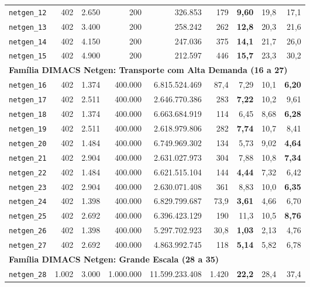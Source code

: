 \documentclass[12pt,a4paper]{article}
\begin{document}
\begin{longtable}{lrrrrrrrr}
\texttt{netgen\_12} & 402 & 2.650 & 200 & 326.853 & 179 & \textbf{9,60} & 19,8 & 17,1 \\
\texttt{netgen\_13} & 402 & 3.400 & 200 & 258.242 & 262 & \textbf{12,8} & 20,3 & 21,6 \\
\texttt{netgen\_14} & 402 & 4.150 & 200 & 247.036 & 375 & \textbf{14,1} & 21,7 & 26,0 \\
\texttt{netgen\_15} & 402 & 4.900 & 200 & 212.597 & 446 & \textbf{15,7} & 23,3 & 30,2 \\
\midrule
\multicolumn{9}{l}{\textbf{Família DIMACS Netgen: Transporte com Alta Demanda (16 a 27)}} \\
\midrule
\texttt{netgen\_16} & 402 & 1.374 & 400.000 & 6.815.524.469 & 87,4 & 7,29 & 10,1 & \textbf{6,20} \\
\texttt{netgen\_17} & 402 & 2.511 & 400.000 & 2.646.770.386 & 283 & \textbf{7,22} & 10,2 & 9,61 \\
\texttt{netgen\_18} & 402 & 1.374 & 400.000 & 6.663.684.919 & 114 & 6,45 & 8,68 & \textbf{6,28} \\
\texttt{netgen\_19} & 402 & 2.511 & 400.000 & 2.618.979.806 & 282 & \textbf{7,74} & 10,7 & 8,41 \\
\texttt{netgen\_20} & 402 & 1.484 & 400.000 & 6.749.969.302 & 134 & 5,73 & 9,02 & \textbf{4,64} \\
\texttt{netgen\_21} & 402 & 2.904 & 400.000 & 2.631.027.973 & 304 & 7,88 & 10,8 & \textbf{7,34} \\
\texttt{netgen\_22} & 402 & 1.484 & 400.000 & 6.621.515.104 & 144 & \textbf{4,44} & 7,32 & 6,42 \\
\texttt{netgen\_23} & 402 & 2.904 & 400.000 & 2.630.071.408 & 361 & 8,83 & 10,0 & \textbf{6,35} \\
\texttt{netgen\_24} & 402 & 1.398 & 400.000 & 6.829.799.687 & 73,9 & \textbf{3,61} & 4,66 & 6,70 \\
\texttt{netgen\_25} & 402 & 2.692 & 400.000 & 6.396.423.129 & 190 & 11,3 & 10,5 & \textbf{8,76} \\
\texttt{netgen\_26} & 402 & 1.398 & 400.000 & 5.297.702.923 & 30,8 & \textbf{1,03} & 2,13 & 4,76 \\
\texttt{netgen\_27} & 402 & 2.692 & 400.000 & 4.863.992.745 & 118 & \textbf{5,14} & 5,82 & 6,78 \\
\midrule
\multicolumn{9}{l}{\textbf{Família DIMACS Netgen: Grande Escala (28 a 35)}} \\
\midrule
\texttt{netgen\_28} & 1.002 & 3.000 & 1.000.000 & 11.599.233.408 & 1.420 & \textbf{22,2} & 28,4 & 37,4 \\

\end{longtable}
\end{document}
